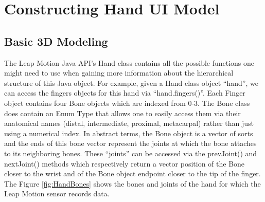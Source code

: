 \chapter{Constructing Hand UI Model}

\label{Chapter3_uiHandModel} 

\section{Basic 3D Modeling}
The Leap Motion Java API’s Hand class contains all the possible functions one might need to use when gaining more information about the hierarchical structure of this Java object. For example, given a Hand class object “hand”, we can access the fingers objects for this hand via “hand.fingers()”.  Each Finger object contains four Bone objects which are indexed from 0-3. The Bone class does contain an Enum Type that allows one to easily access them via their anatomical names (distal, intermediate, proximal, metacarpal) rather than just using a numerical index. In abstract terms, the Bone object is a vector of sorts and the ends of this bone vector represent the joints at which the bone attaches to its neighboring bones. These “joints” can be accessed via the prevJoint() and nextJoint() methods which respectively return a vector position of the Bone closer to the wrist and of the Bone object endpoint closer to the tip of the finger. The Figure \ref{fig:HandBones} shows the bones and joints of the hand for which the Leap Motion sensor records data.  

